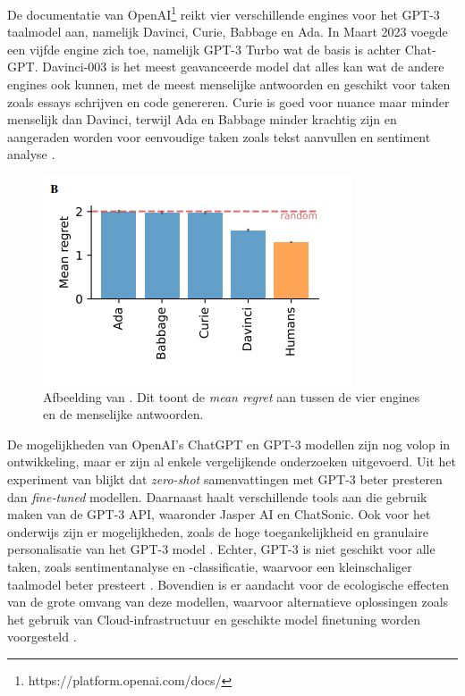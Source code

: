 \medspace

De documentatie van OpenAI\footnote{https://platform.openai.com/docs/} reikt vier verschillende engines voor het GPT-3 taalmodel aan, namelijk Davinci, Curie, Babbage en Ada. In Maart 2023 voegde een vijfde engine zich toe, namelijk GPT-3 Turbo wat de basis is achter Chat-GPT. Davinci-003 is het meest geavanceerde model dat alles kan wat de andere engines ook kunnen, met de meest menselijke antwoorden en geschikt voor taken zoals essays schrijven en code genereren. Curie is goed voor nuance maar minder menselijk dan Davinci, terwijl Ada en Babbage minder krachtig zijn en aangeraden worden voor eenvoudige taken zoals tekst aanvullen en sentiment analyse \autocite{Brockman2023}. 

\begin{figure}
	\begin{center}
		\includegraphics{img/chatgpt-engines-mean-regret.png}
		\caption{Afbeelding van \textcite{Binz2023}. Dit toont de \textit{mean regret} aan tussen de vier engines en de menselijke antwoorden.}
	\end{center}
\end{figure}

\medspace

De mogelijkheden van OpenAI's ChatGPT en GPT-3 modellen zijn nog volop in ontwikkeling, maar er zijn al enkele vergelijkende onderzoeken uitgevoerd. Uit het experiment van \textcite{Goyal2022} blijkt dat \textit{zero-shot} samenvattingen met GPT-3 beter presteren dan \textit{fine-tuned} modellen. Daarnaast haalt \textcite{Mottesi2023} verschillende tools aan die gebruik maken van de GPT-3 API, waaronder Jasper AI en ChatSonic. Ook voor het onderwijs zijn er mogelijkheden, zoals de hoge toegankelijkheid en granulaire personalisatie van het GPT-3 model \autocite{Roose2023, Garg2022}. Echter, GPT-3 is niet geschikt voor alle taken, zoals sentimentanalyse en -classificatie, waarvoor een kleinschaliger taalmodel beter presteert \autocite{Li2022}. Bovendien is er aandacht voor de ecologische effecten van de grote omvang van deze modellen, waarvoor alternatieve oplossingen zoals het gebruik van Cloud-infrastructuur en geschikte model finetuning worden voorgesteld \autocite{Strubell2019, Simon2021}.

